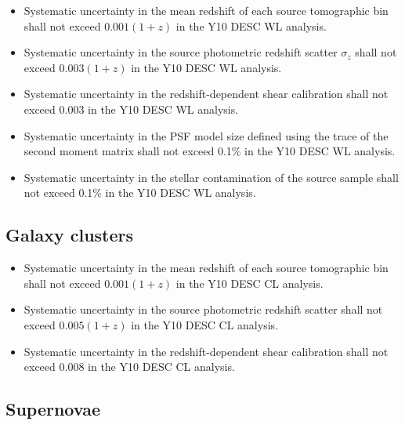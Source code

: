 \documentclass[modern]{desc-tex/styles/lsstdescnote}
\begin{document}
\begin{itemize}
\item Systematic uncertainty in the mean redshift of each source tomographic bin shall not exceed $0.001 (1 + z)$ in the Y10 DESC WL analysis.
\item Systematic uncertainty in the source photometric redshift scatter $\sigma_z$  shall not exceed $0.003 (1 + z) $ in the Y10 DESC WL analysis.
\item Systematic uncertainty in the redshift-dependent shear calibration shall not exceed 0.003 in the Y10 DESC WL analysis.
\item Systematic uncertainty in the PSF model size defined using the trace of the second moment matrix shall not exceed 0.1\% in the Y10 DESC WL analysis.
\item Systematic uncertainty in the stellar contamination of the source sample shall not exceed 0.1\% in the Y10 DESC WL analysis.
\end{itemize}

\subsection{Galaxy clusters}

\begin{itemize}
\item Systematic uncertainty in the mean redshift of each source tomographic bin shall not exceed $ 0.001( 1 + z)$ in the Y10 DESC CL analysis.
\item Systematic uncertainty in the source photometric redshift scatter shall not exceed $0.005 (1 + z)$ in the Y10 DESC CL analysis.
\item Systematic uncertainty in the redshift-dependent shear calibration shall not exceed 0.008 in the Y10 DESC CL analysis.
\end{itemize}

\subsection{Supernovae}
\end{document}
